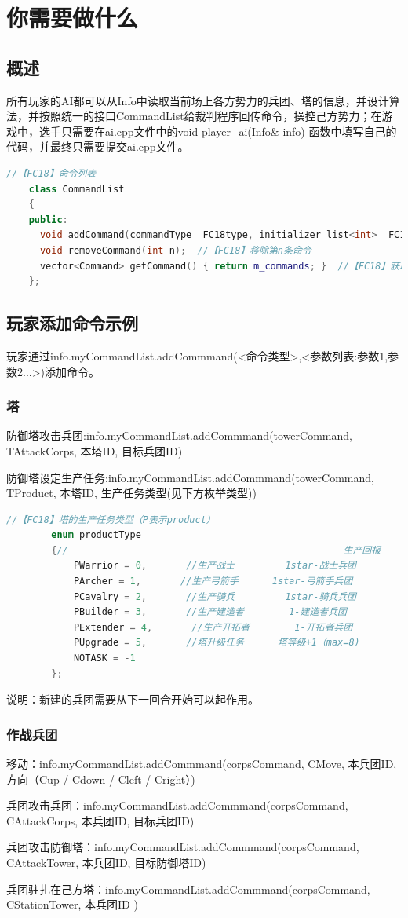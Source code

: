 \documentclass[a4paper,4pt]{article}
\begin{document}
\section{你需要做什么}
\subsection{概述}
所有玩家的AI都可以从Info中读取当前场上各方势力的兵团、塔的信息，并设计算法，并按照统一的接口CommandList给裁判程序回传命令，操控己方势力；在游戏中，选手只需要在ai.cpp文件中的void player\_ai(Info\& info) {  }函数中填写自己的代码，并最终只需要提交ai.cpp文件。
\begin{lstlisting}[language={C++},title={添加命令有关代码}]  %插入代码块
    //【FC18】命令列表
    class CommandList
    {
    public:
      void addCommand(commandType _FC18type, initializer_list<int> _FC18parameters);
      void removeCommand(int n);  //【FC18】移除第n条命令
      vector<Command> getCommand() { return m_commands; }  //【FC18】获取所有命令
    };
\end{lstlisting}

\subsection{玩家添加命令示例}
玩家通过info.myCommandList.addCommmand(<命令类型>,<参数列表:参数1,参数2...>)添加命令。
\subsubsection{塔}
防御塔攻击兵团:info.myCommandList.addCommmand(towerCommand, {TAttackCorps, 本塔ID, 目标兵团ID})\par
防御塔设定生产任务:info.myCommandList.addCommmand(towerCommand, {TProduct, 本塔ID, 生产任务类型(见下方枚举类型)})\par
\begin{lstlisting}[language={C++},title={生产任务类型}]  %插入代码块
		//【FC18】塔的生产任务类型（P表示product）
		enum productType
		{//                                                 生产回报
			PWarrior = 0,       //生产战士         1star-战士兵团
			PArcher = 1,       //生产弓箭手      1star-弓箭手兵团
			PCavalry = 2,       //生产骑兵         1star-骑兵兵团
			PBuilder = 3,       //生产建造者        1-建造者兵团
			PExtender = 4,       //生产开拓者        1-开拓者兵团
			PUpgrade = 5,       //塔升级任务      塔等级+1（max=8)
			NOTASK = -1
		};
\end{lstlisting}
说明：新建的兵团需要从下一回合开始可以起作用。
\subsubsection{作战兵团}
移动：info.myCommandList.addCommmand(corpsCommand, {CMove, 本兵团ID, 方向（Cup / Cdown / Cleft / Cright）})\par
兵团攻击兵团：info.myCommandList.addCommmand(corpsCommand, {CAttackCorps, 本兵团ID, 目标兵团ID})\par
兵团攻击防御塔：info.myCommandList.addCommmand(corpsCommand, {CAttackTower, 本兵团ID, 目标防御塔ID})\par
兵团驻扎在己方塔：info.myCommandList.addCommmand(corpsCommand, {CStationTower, 本兵团ID }) \par
\end{document}
